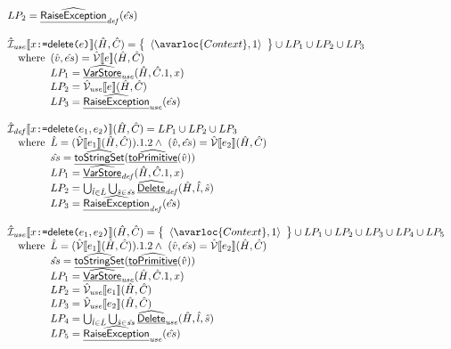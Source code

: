 \[\begin{array}{l}
{    LP_2 = \ahf{RaiseException}_{\it def}(\hat{es})
  }
  \\\\
  \aI_{\it use}\lbr x \TT{:=} \SF{delete}\TT{(}e\TT{)} \rbr(\hat{H},\hat{C})
  = \set{\langle \avarloc{Context}, 1\rangle} \cup LP_1 \cup LP_2 \cup LP_3\\
  \quad\wherec{
    (\hat{v},\hat{es}) = \aV\lbr e\rbr(\hat{H},\hat{C})\\
    LP_1 = \ahf{VarStore}_{\it use}(\hat{H}, \hat{C}.1, x)\\
    LP_2 = \aV_{\it use}\lbr e\rbr(\hat{H},\hat{C})\\
    LP_3 = \ahf{RaiseException}_{\it use}(\hat{es})
  }
  \\\\
  \aI_{\it def}\lbr x \TT{:=} \SF{delete}\TT{(}e_1,e_2\TT{)} \rbr(\hat{H},\hat{C})
  = LP_1\cup LP_2 \cup LP_3 \\
  \quad\wherec{
    \hat{L}=(\aV\lbr e_1\rbr(\hat{H},\hat{C})).1.2
    \land\ (\hat{v}, \hat{es}) = \aV\lbr e_2\rbr(\hat{H},\hat{C}) \\
    \hat{ss} = \ahf{toStringSet}(\ahf{toPrimitive}(\hat{v})) \\
    LP_1 = \ahf{VarStore}_{\it def}(\hat{H}, \hat{C}.1, x)\\
    LP_2 = \bigcup_{\hat{l}\in\hat{L}} \bigcup_{\hat{s}\in\hat{ss}} \ahf{Delete}_{\it def}(\hat{H},\hat{l},\hat{s}) \\
    LP_3 = \ahf{RaiseException}_{\it def}(\hat{es})
  }
  \\\\
  \aI_{\it use}\lbr x \TT{:=} \SF{delete}\TT{(}e_1,e_2\TT{)} \rbr(\hat{H},\hat{C})
  = \set{\langle \avarloc{Context}, 1\rangle} \cup LP_1 \cup LP_2\cup LP_3 \cup LP_4 \cup LP_5 \\
  \quad\wherec{
    \hat{L}=(\aV\lbr e_1\rbr(\hat{H},\hat{C})).1.2
    \land\ (\hat{v}, \hat{es}) = \aV\lbr e_2\rbr(\hat{H},\hat{C}) \\
    \hat{ss} = \ahf{toStringSet}(\ahf{toPrimitive}(\hat{v})) \\
    LP_1 = \ahf{VarStore}_{\it use}(\hat{H}, \hat{C}.1, x)\\
    LP_2 = \aV_{\it use}\lbr e_1\rbr(\hat{H},\hat{C})\\
    LP_3 = \aV_{\it use}\lbr e_2\rbr(\hat{H},\hat{C})\\
    LP_4 = \bigcup_{\hat{l}\in\hat{L}} \bigcup_{\hat{s}\in\hat{ss}} \ahf{Delete}_{\it use}(\hat{H},\hat{l},\hat{s}) \\
    LP_5 = \ahf{RaiseException}_{\it use}(\hat{es})
  }
  \\\\


\end{array}\]

